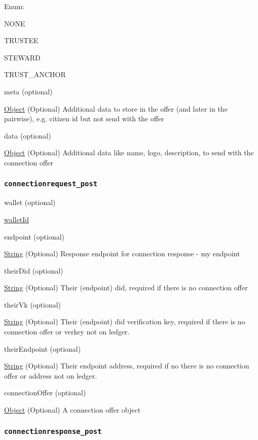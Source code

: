 Enum:

NONE

TRUSTEE

STEWARD

TRUST\_ANCHOR

meta (optional)

{\protect\hyperlink{object}{Object}} (Optional) Additional data to store
in the offer (and later in the pairwise), e.g. citizen id but not send
with the offer

data (optional)

{\protect\hyperlink{object}{Object}} (Optional) Additional data like
name, logo, description, to send with the connection offer

\hypertarget{connectionrequest_post}{%
\subsubsection{\texorpdfstring{\protect\hypertarget{connectionrequest_post}{}{\texttt{connectionrequest\_post}}}{connectionrequest\_post}}\label{connectionrequest_post}}

wallet (optional)

{\protect\hyperlink{walletId}{walletId}}

endpoint (optional)

{\protect\hyperlink{string}{String}} (Optional) Response endpoint for
connection response - my endpoint

theirDid (optional)

{\protect\hyperlink{string}{String}} (Optional) Their (endpoint) did,
required if there is no connection offer

theirVk (optional)

{\protect\hyperlink{string}{String}} (Optional) Their (endpoint) did
verification key, required if there is no connection offer or verkey not
on ledger.

theirEndpoint (optional)

{\protect\hyperlink{string}{String}} (Optional) Their endpoint address,
required if no there is no connection offer or address not on ledger.

connectionOffer (optional)

{\protect\hyperlink{object}{Object}} (Optional) A connection offer
object

\hypertarget{connectionresponse_post}{%
\subsubsection{\texorpdfstring{\protect\hypertarget{connectionresponse_post}{}{\texttt{connectionresponse\_post}}}{connectionresponse\_post}}\label{connectionresponse_post}}

